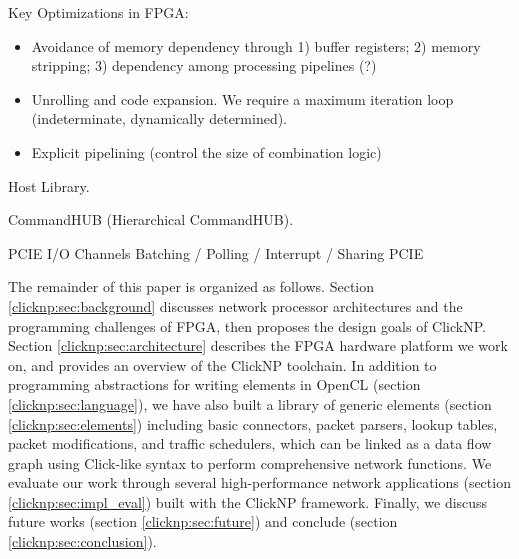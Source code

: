 {Key Optimizations in FPGA:
\begin{itemize}
\item Avoidance of memory dependency through 1) buffer registers; 2) memory stripping; 3) dependency among processing pipelines (?)
\item Unrolling and code expansion. We require a maximum iteration loop (indeterminate, dynamically determined).
\item Explicit pipelining (control the size of combination logic)
\end{itemize}

Host Library.

CommandHUB (Hierarchical CommandHUB).

PCIE I/O Channels
Batching / Polling / Interrupt / Sharing PCIE 

The remainder of this paper is organized as follows. Section \ref{clicknp:sec:background} discusses network processor architectures and the programming challenges of FPGA, then proposes the design goals of ClickNP. Section \ref{clicknp:sec:architecture} describes the FPGA hardware platform we work on, and provides an overview of the ClickNP toolchain. In addition to programming abstractions for writing elements in OpenCL (section \ref{clicknp:sec:language}), we have also built a library of generic elements (section \ref{clicknp:sec:elements}) including basic connectors, packet parsers, lookup tables, packet modifications, and traffic schedulers, which can be linked as a data flow graph using Click-like syntax to perform comprehensive network functions. We evaluate our work through several high-performance network applications (section \ref{clicknp:sec:impl_eval}) built with the ClickNP framework. Finally, we discuss future works (section \ref{clicknp:sec:future}) and conclude (section \ref{clicknp:sec:conclusion}).
}


